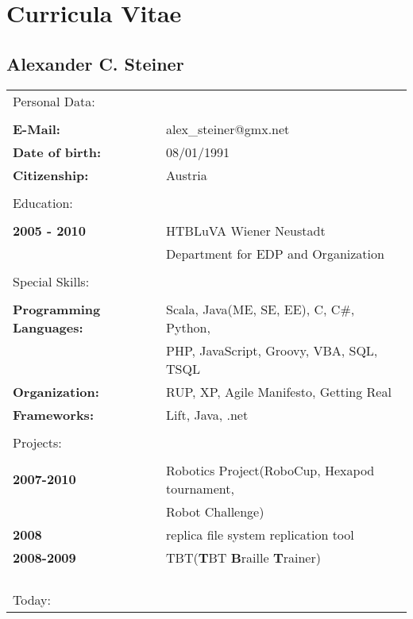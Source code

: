 \chapter{Curricula Vitae}
\section{Alexander C. Steiner}\begin{tabular}{ll}
\large{Personal Data:}\\ \\
\textbf{E-Mail:}                    &       alex\_steiner@gmx.net\\
\textbf{Date of birth:}             &       08/01/1991\\
\textbf{Citizenship:}               &       Austria\\
\\
\large{Education:}\\
\\
\textbf{2005 - 2010}                &       HTBLuVA Wiener Neustadt \\
                                    &       Department for EDP and Organization\\
\\
\large{Special Skills:}\\
\\
\textbf{Programming Languages:}     &       Scala, Java(ME, SE, EE), C, C\#, Python,\\
                                    &       PHP, JavaScript, Groovy, VBA, SQL, TSQL\\
\textbf{Organization:}              &       RUP, XP, Agile Manifesto, Getting Real\\
\textbf{Frameworks:}                &       Lift, Java, .net\\
\\
\large{Projects:}\\
\\
\textbf{2007-2010}                  &       Robotics Project(RoboCup, Hexapod tournament,\\
                                    &       Robot Challenge)\\
\textbf{2008}                       &       replica file system replication tool\\
\textbf{2008-2009}                  &       TBT(\textbf{T}BT \textbf{B}raille \textbf{T}rainer)\\
\\ \\ \\ \\
\large{Today:}\\
\end{tabular}
